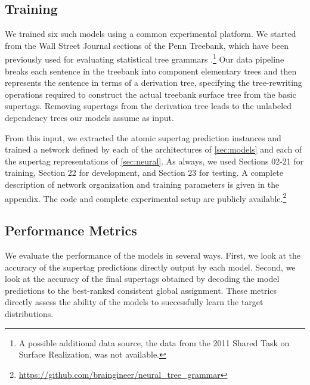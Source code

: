 \documentclass[11pt]{article}
\begin{document}
\subsection{Training}

We trained six such models using a common experimental platform.  We
started from the Wall Street Journal sections of the Penn Treebank,
which have been previously used for evaluating statistical tree
grammars \cite{chiang2000statistical}.\footnote{A possible additional
  data source, the data from the 2011 Shared Task on Surface
  Realization, was not available.}
%
Our data pipeline breaks each sentence in the treebank into component
elementary trees and then represents the sentence in terms of a
derivation tree, specifying the tree-rewriting operations required to
construct the actual treebank surface tree from the basic supertags.
%
Removing supertags from the derivation tree leads to the unlabeled
dependency trees our models assume as input.

From this input, we extracted the atomic supertag prediction instances
and trained a network defined by each of the architectures of
\ref{sec:models} and each of the supertag representations of
\ref{sec:neural}.  As always, we used Sections 02-21 for training,
Section 22 for development, and Section 23 for testing.  A complete
description of network organization and training parameters is given
in the appendix.  The code and complete experimental setup are
publicly
available.\footnote{\url{https://github.com/braingineer/neural_tree_grammar}}

\subsection{Performance Metrics}


We evaluate the performance of the models in several ways.  First, we
look at the accuracy of the supertag predictions directly output by
each model.  Second, we look at the accuracy of the final supertags
obtained by decoding the model predictions to the best-ranked
consistent global assignment.  These metrics directly assess the
ability of the models to successfully learn the target distributions.
\end{document}
